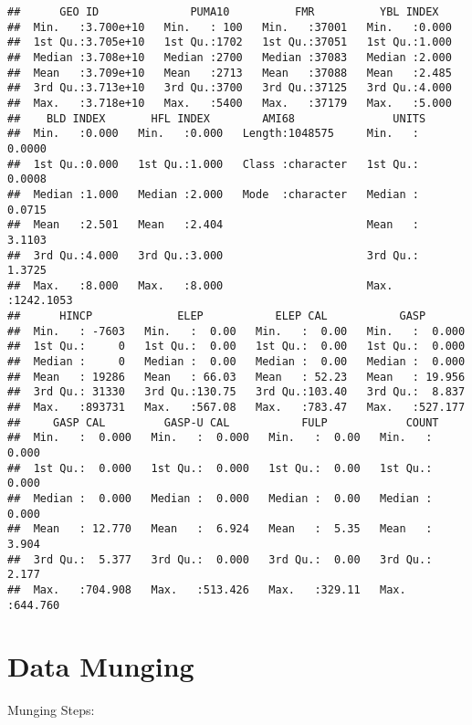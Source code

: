 \documentclass[]{article}
\begin{document}
\begin{verbatim}
##      GEO ID              PUMA10          FMR          YBL INDEX    
##  Min.   :3.700e+10   Min.   : 100   Min.   :37001   Min.   :0.000  
##  1st Qu.:3.705e+10   1st Qu.:1702   1st Qu.:37051   1st Qu.:1.000  
##  Median :3.708e+10   Median :2700   Median :37083   Median :2.000  
##  Mean   :3.709e+10   Mean   :2713   Mean   :37088   Mean   :2.485  
##  3rd Qu.:3.713e+10   3rd Qu.:3700   3rd Qu.:37125   3rd Qu.:4.000  
##  Max.   :3.718e+10   Max.   :5400   Max.   :37179   Max.   :5.000  
##    BLD INDEX       HFL INDEX        AMI68               UNITS          
##  Min.   :0.000   Min.   :0.000   Length:1048575     Min.   :   0.0000  
##  1st Qu.:0.000   1st Qu.:1.000   Class :character   1st Qu.:   0.0008  
##  Median :1.000   Median :2.000   Mode  :character   Median :   0.0715  
##  Mean   :2.501   Mean   :2.404                      Mean   :   3.1103  
##  3rd Qu.:4.000   3rd Qu.:3.000                      3rd Qu.:   1.3725  
##  Max.   :8.000   Max.   :8.000                      Max.   :1242.1053  
##      HINCP             ELEP           ELEP CAL           GASP        
##  Min.   : -7603   Min.   :  0.00   Min.   :  0.00   Min.   :  0.000  
##  1st Qu.:     0   1st Qu.:  0.00   1st Qu.:  0.00   1st Qu.:  0.000  
##  Median :     0   Median :  0.00   Median :  0.00   Median :  0.000  
##  Mean   : 19286   Mean   : 66.03   Mean   : 52.23   Mean   : 19.956  
##  3rd Qu.: 31330   3rd Qu.:130.75   3rd Qu.:103.40   3rd Qu.:  8.837  
##  Max.   :893731   Max.   :567.08   Max.   :783.47   Max.   :527.177  
##     GASP CAL         GASP-U CAL           FULP            COUNT        
##  Min.   :  0.000   Min.   :  0.000   Min.   :  0.00   Min.   :  0.000  
##  1st Qu.:  0.000   1st Qu.:  0.000   1st Qu.:  0.00   1st Qu.:  0.000  
##  Median :  0.000   Median :  0.000   Median :  0.00   Median :  0.000  
##  Mean   : 12.770   Mean   :  6.924   Mean   :  5.35   Mean   :  3.904  
##  3rd Qu.:  5.377   3rd Qu.:  0.000   3rd Qu.:  0.00   3rd Qu.:  2.177  
##  Max.   :704.908   Max.   :513.426   Max.   :329.11   Max.   :644.760
\end{verbatim}

\hypertarget{data-munging}{%
\section{Data Munging}\label{data-munging}}

Munging Steps:
\end{document}
